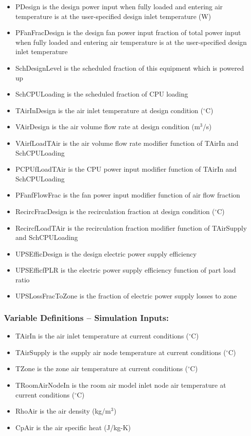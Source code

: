 \begin{itemize}
\tightlist
\item
  PDesign is the design power input when fully loaded and entering air temperature is at the user-specified design inlet temperature (W)
\item
  PFanFracDesign is the design fan power input fraction of total power input when fully loaded and entering air temperature is at the user-specified design inlet temperature
\item
  SchDesignLevel is the scheduled fraction of this equipment which is powered up
\item
  SchCPULoading is the scheduled fraction of CPU loading
\item
  TAirInDesign is the air inlet temperature at design condition (\(^{\circ}\)C)
\item
  VAirDesign is the air volume flow rate at design condition (m\(^3\)/s)
\item
  VAirfLoadTAir is the air volume flow rate modifier function of TAirIn and SchCPULoading
\item
  PCPUfLoadTAir is the CPU power input modifier function of TAirIn and SchCPULoading
\item
  PFanfFlowFrac is the fan power input modifier function of air flow fraction
\item
  RecircFracDesign is the recirculation fraction at design condition (\(^{\circ}\)C)
\item
  RecircfLoadTAir is the recirculation fraction modifier function of TAirSupply and SchCPULoading
\item
  UPSEfficDesign is the design electric power supply efficiency
\item
  UPSEfficfPLR is the electric power supply efficiency function of part load ratio
\item
  UPSLossFracToZone is the fraction of electric power supply losses to zone
\end{itemize}

\subsubsection{Variable Definitions -- Simulation Inputs:}\label{variable-definitions-simulation-inputs}

\begin{itemize}
\tightlist
\item
  TAirIn is the air inlet temperature at current conditions (\(^{\circ}\)C)
\item
  TAirSupply is the supply air node temperature at current conditions (\(^{\circ}\)C)
\item
  TZone is the zone air temperature at current conditions (\(^{\circ}\)C)
\item
  TRoomAirNodeIn is the room air model inlet node air temperature at current conditions (\(^{\circ}\)C)
\item
  RhoAir is the air density (kg/m\(^3\))
\item
  CpAir is the air specific heat (J/kg-K)
\end{itemize}


